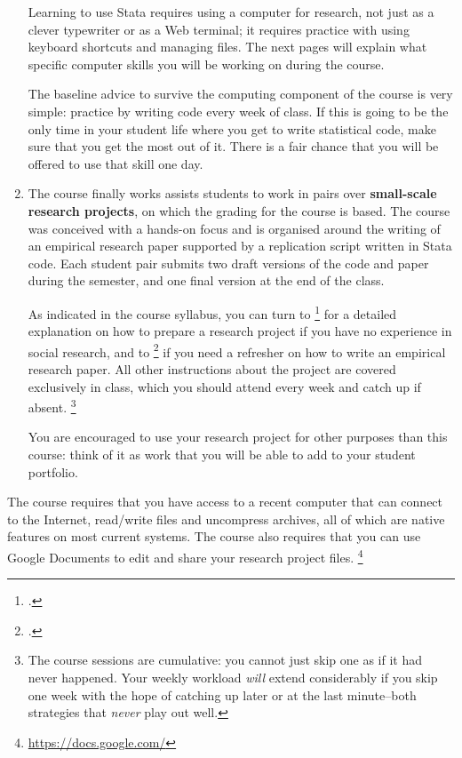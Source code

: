 \begin{enumerate}
		Learning to use Stata requires using a computer for research, not just as a clever typewriter or as a Web terminal; it requires practice with using keyboard shortcuts and managing files. The next pages will explain what specific computer skills you will be working on during the course.%
		
		The baseline advice to survive the computing component of the course is very simple: practice by writing code every week of class. If this is going to be the only time in your student life where you get to write statistical code, make sure that you get the most out of it. There is a fair chance that you will be offered to use that skill one day.%


  \item The course finally works assists students to work in pairs over \textbf{small-scale research projects}, on which the grading for the course is based. %
		The course was conceived with a hands-on focus and is organised around the  writing of an empirical research paper supported by a replication script written in Stata code. Each student pair submits two draft versions of the code and paper during the semester, and one final version at the end of the class.%
		
		As indicated in the course syllabus, you can turn to \footcite{BoothWilliams:2003v} for a detailed explanation on how to prepare a research project if you have no experience in social research, and to \footcite{White:2005a} if you need a refresher on how to write an empirical research paper. All other instructions about the project are covered exclusively in class, which you should attend every week and catch up if absent.%
		\footnote{The course sessions are cumulative: you cannot just skip one as if it had never happened. Your weekly workload \emph{will} extend considerably if you skip one week with the hope of catching up later or at the last minute–both strategies that \emph{never} play out well.}%
		
		You are encouraged to use your research project for other purposes than this course: think of it as work that you will be able to add to your student portfolio.%

\end{enumerate}

	The course requires that you have access to a recent computer that can connect to the Internet, read/write \PDF files and uncompress \ZIP archives, all of which are native features on most current systems. The course also requires that you can use Google Documents to edit and share your research project files.%
		\footnote{\url{https://docs.google.com/}}%


